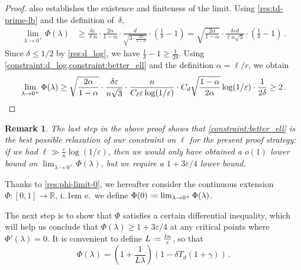 \documentclass[10pt,a4paper]{article}
\newtheorem{remark}{Remark}[section]
\newcommand*\ie{i.\kern.1em e.\ }
\newcommand*{\define}{\mathrel{\vcenter{\baselineskip0.5ex \lineskiplimit0pt
                      \hbox{\scriptsize.}\hbox{\scriptsize.}}}%
                      =}
\newcommand{\bR}{\ensuremath{\mathbb{R}}}
\renewcommand{\epsilon}{\varepsilon}
\begin{document}
\begin{proof}
    also establishes the existence and finiteness of the limit. Using \cref{res:td-prime-lb} and the
    definition of~$\delta$,
    \begin{align*}
        \lim_{\lambda \to 0^+} \Phi(\lambda)
        &\ge \frac{\delta \epsilon}{\ell n} \cdot \frac{2\alpha}{1-\alpha}
            \cdot \frac{d}{\sqrt{3 \cdot \frac{2\alpha}{1-\alpha}}}
            \cdot \left(\frac{1}{\delta} - 1\right)
        = \sqrt{\frac{2\alpha}{1-\alpha}} \cdot
            \frac{\delta \epsilon d}{\ell n \sqrt{3}} \cdot \left(\frac{1}{\delta} - 1\right) \,.
    \end{align*}
    Since $\delta \le 1/2$ by \cref{res:d_log}, we have $\frac{1}{\delta} - 1 \ge
    \frac{1}{2\delta}$. Using \cref{constraint:d_log,constraint:better_ell} and the definition
    $\alpha = \ell/r$, we obtain
    \[
        \lim_{\lambda \to 0^+} \Phi(\lambda)
        \ge \sqrt{\frac{2\alpha}{1-\alpha}} \cdot
            \frac{\delta \epsilon}{n\sqrt{3}}
            \cdot \frac{n}{C_\ell \epsilon \log(1/\epsilon)}
            \cdot C_d \sqrt{\frac{1-\alpha}{2\alpha}} \log(1/\epsilon)
            \cdot \frac{1}{2\delta}
        \ge 2 \,. \qedhere
    \]
\end{proof}

\begin{remark}
\label{remark:no-better-parameter}
The last step in the above proof shows that \cref{constraint:better_ell} is the best possible
relaxation of our constraint on $\ell$ for the present proof strategy: if we had $\ell \gg
\tfrac{\epsilon}{n} \log(1/\epsilon)$, then we would only have obtained a $o(1)$ lower bound on
$\lim_{\lambda \to 0^+} \Phi(\lambda)$, but we require a $1 + 3\epsilon/4$ lower bound.
\end{remark}

Thanks to \cref{res:phi-limit-0}, we hereafter consider the continuous extension $\Phi : [0,1] \to
\bR$, \ie we define $\Phi(0) \define \lim_{\lambda \to 0^+} \Phi(\lambda)$.

The next step is to show that $\Phi$ satisfies a certain differential inequality, which will help us
conclude that $\Phi(\lambda) \ge 1 + 3\epsilon/4$ at any critical points where $\Phi'(\lambda) = 0$.
It is convenient to define $L \define \tfrac{\ell n}{\epsilon}$, so that
\[
  \Phi(\lambda) = \left(1 + \frac{1}{L \lambda}\right) (1 - \delta T_d(1+\gamma)) \,.
\]
\end{document}
